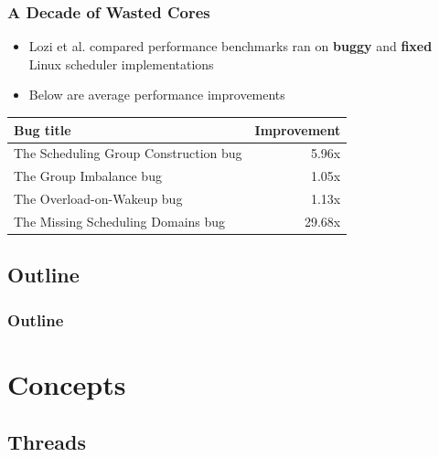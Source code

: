 \documentclass{beamer}
\newcommand{\linespace}{\vskip 0.25cm}
\begin{document}
\begin{frame}
\frametitle{A Decade of Wasted Cores}


\begin{itemize}

\item Lozi et al. compared performance benchmarks ran on \textbf{buggy} and \textbf{fixed} Linux scheduler implementations

\item Below are average performance improvements

\linespace
\end{itemize}

\begin{table}
	\centering
	\begin{tabular}{| l | r |}
	\hline
	\textbf{Bug title} & \textbf{Improvement} \\ \hline
	The Scheduling Group Construction bug & 5.96x \\ \hline
	The Group Imbalance bug & 1.05x \\ \hline
	The Overload-on-Wakeup bug & 1.13x\\ \hline
	The Missing Scheduling Domains bug & 29.68x \\ \hline
\end{tabular}
\end{table}

\end{frame}

\subsection*{Outline}

\begin{frame}
  \frametitle{Outline}
  \tableofcontents[hideallsubsections]
\end{frame}

\section[Concepts]{Concepts}

\subsection[Threads]{Threads}
\end{document}
